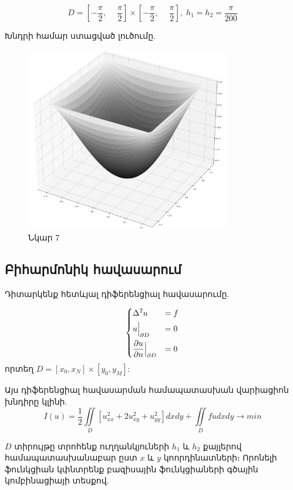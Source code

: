 \documentclass[fleqn, bachelor,subf,12pt,notitlepage]{disser}
\begin{document}
				$$ D = \left[-\dfrac{\pi}{2}, \phantom{-}\dfrac{\pi}{2}\right] \times \left[-\dfrac{\pi}{2}, \phantom{-}\dfrac{\pi}{2}\right], \; h_{1}=h_{2}=\dfrac{\pi}{200}$$

\noindent Խնդրի համար ստացված լուծումը.

\begin{figure}[h!]
\centering
\includegraphics[width=0.8\textwidth]{images/poisson_solution}
\captionsetup{labelformat=empty}
\caption{\hfill Նկար 7}
\end{figure}

\newpage
\subsection*{Բիհարմոնիկ հավասարում}

Դիտարկենք հետևյալ դիֆերենցիալ հավասարումը.

$$\begin{dcases}
								\Delta^{2} u &=f \\
								u \Big |_{\partial D} &= 0\\
								\dfrac{\partial u}{\partial n} \Big |_{\partial D} &= 0
\end{dcases}$$
որտեղ $D = \left[x_{0}, x_{N}\right] \times \left[y_{0}, y_{M}\right]$:

Այս դիֆերենցիալ հավասարման  համապատասխան վարիացիոն խնդիրը կլինի.
			$$I(u) = \frac{1}{2}\iint \limits_{D} \left[u_{xx}^{2} + 2u_{xy}^{2} + u_{yy}^{2} \right]dxdy + \iint \limits_{D} fudxdy \longrightarrow min$$

$D$ տիրույթը տրոհենք ուղղանկյուների $h_{1}$ և $h_{2}$ քայլերով համապատասխանաբար ըստ $x$ և $y$ կոորդինատների։
\noindent Որոնելի ֆունկցիան կփնտրենք բազիսային ֆունկցիաների գծային կոմբինացիայի տեսքով.
\end{document}
